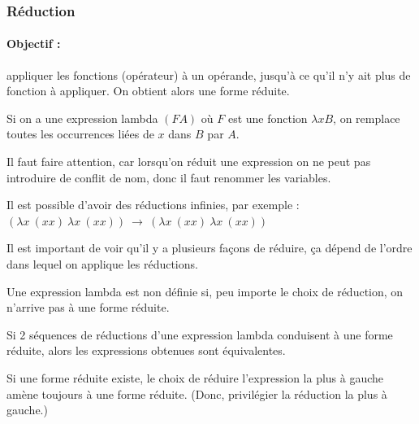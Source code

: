 \subsubsection{Réduction}

\paragraph{Objectif :} appliquer les fonctions (opérateur) à un opérande, 
jusqu'à ce qu'il n'y ait plus de fonction à appliquer. On obtient alors une 
forme réduite.

\begin{mydef} Si on a une expression lambda $(FA)$ où 
	$F$ est une fonction $\lambda xB$, on remplace toutes les occurrences liées 
	de $x$ dans $B$ par $A$.
\end{mydef}

\begin{myrem}
	Il faut faire attention, car lorsqu'on réduit une expression on ne peut 
	pas introduire de conflit de nom, donc il faut renommer les variables.
\end{myrem}

\begin{myrem}
	Il est possible d'avoir des réductions infinies, par exemple :\\ 
	$(\lambda x\ (xx)\ \lambda x \ (xx)) \ \rightarrow \ (\lambda x\ (xx) \  
\lambda x \ (xx))$
\end{myrem}

\begin{myrem}
	Il est important de voir qu'il y a plusieurs façons de réduire, ça 
	dépend de l'ordre dans lequel on applique les réductions.
\end{myrem}

\begin{myprop}
	Une expression lambda est non définie si, peu importe le choix de 
	réduction, on n’arrive pas à une forme réduite.
\end{myprop}

\begin{mytheo} Si 2 séquences de réductions d'une expression 
	lambda conduisent à une forme réduite, alors les expressions obtenues 
	sont équivalentes.
\end{mytheo}

\begin{myprop}
	Si une forme réduite existe, le choix de réduire l'expression la plus à 
	gauche amène toujours à une forme réduite. (Donc, privilégier la 
	réduction la plus à gauche.)
\end{myprop}

